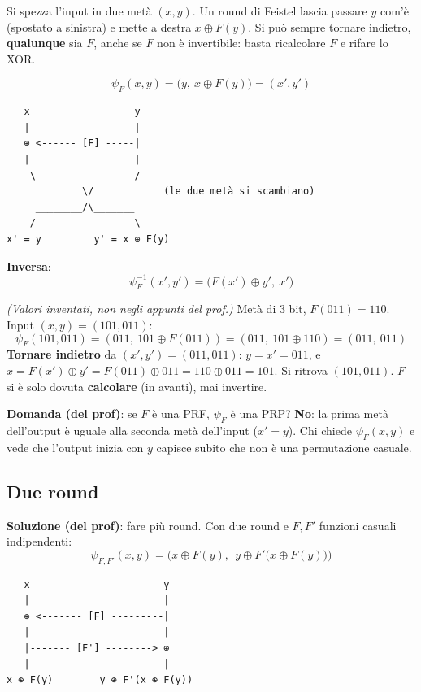 \begin{inbreve}
Si spezza l'input in due metà \((x, y)\). Un round di Feistel lascia passare \(y\) com'è (spostato a sinistra) e mette a destra \(x \oplus F(y)\). Si può sempre tornare indietro, \textbf{qualunque} sia \(F\), anche se \(F\) non è invertibile: basta ricalcolare \(F\) e rifare lo XOR.
\end{inbreve}

\[
\psi_F(x, y) = \big(y,\ x \oplus F(y)\big) = (x', y')
\]

\begin{verbatim}
   x                  y
   |                  |
   ⊕ <------ [F] -----|
   |                  |
    \________  _______/
             \/            (le due metà si scambiano)
     ________/\_______
    /                 \
x' = y         y' = x ⊕ F(y)
\end{verbatim}

\textbf{Inversa}:
\[
\psi_F^{-1}(x', y') = \big(F(x') \oplus y',\ x'\big)
\]

\begin{esempio}
\emph{(Valori inventati, non negli appunti del prof.)} Metà di 3 bit, \(F(011) = 110\). Input \((x, y) = (101, 011)\):
\[
\psi_F(101, 011) = (011,\ 101 \oplus F(011)) = (011,\ 101 \oplus 110) = (011,\ 011)
\]
\textbf{Tornare indietro} da \((x', y') = (011, 011)\): \(y = x' = 011\), e \(x = F(x') \oplus y' = F(011) \oplus 011 = 110 \oplus 011 = 101\). Si ritrova \((101, 011)\). \(F\) si è solo dovuta \textbf{calcolare} (in avanti), mai invertire.
\end{esempio}

\textbf{Domanda (del prof)}: se \(F\) è una PRF, \(\psi_F\) è una PRP? \textbf{No}: la prima metà dell'output è uguale alla seconda metà dell'input (\(x' = y\)). Chi chiede \(\psi_F(x, y)\) e vede che l'output inizia con \(y\) capisce subito che non è una permutazione casuale.

\subsection{Due round}

\textbf{Soluzione (del prof)}: fare più round. Con due round e \(F, F'\) funzioni casuali indipendenti:
\[
\psi_{F, F'}(x, y) = \Big(x \oplus F(y),\ \ y \oplus F'\big(x \oplus F(y)\big)\Big)
\]

\begin{verbatim}
   x                       y
   |                       |
   ⊕ <------- [F] ---------|
   |                       |
   |------- [F'] --------> ⊕
   |                       |
x ⊕ F(y)        y ⊕ F'(x ⊕ F(y))
\end{verbatim}

